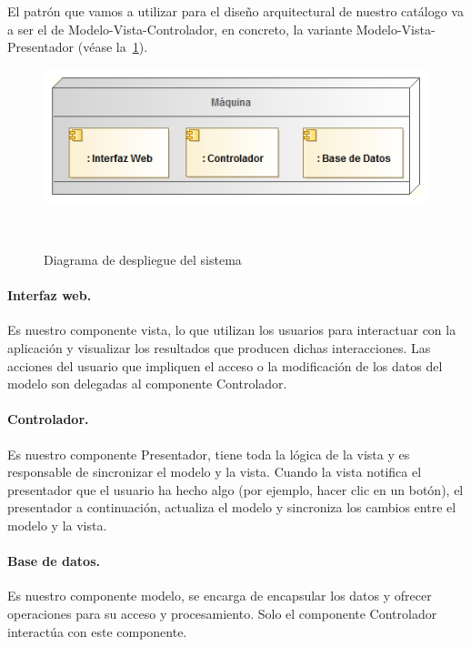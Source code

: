 El patrón que vamos a utilizar para el diseño arquitectural de nuestro 
catálogo va a ser el de Modelo-Vista-Controlador, en concreto, la variante Modelo-Vista-Presentador 
(véase la~\cref{fig:diagDespliegue}).

\vspace{.2cm}
\begin{figure}[ht]
\centerline{\includegraphics[scale=0.6]{img/diagrama_despliegue}}\
\caption{Diagrama de despliegue del sistema}
\label{fig:diagDespliegue}
\end{figure}


\paragraph{Interfaz web.} Es nuestro componente vista, lo que utilizan los usuarios para 
interactuar con la aplicación y visualizar los resultados que producen dichas
interacciones. Las acciones del usuario que impliquen el acceso o la modificación
de los datos del modelo son delegadas al componente Controlador.

\paragraph{Controlador.} Es nuestro componente Presentador, tiene toda la lógica de la vista 
y es responsable de sincronizar el modelo y la vista. Cuando la vista notifica el 
presentador que el usuario ha hecho algo (por ejemplo, hacer clic en un botón), 
el presentador a continuación, actualiza el modelo y sincroniza los cambios 
entre el modelo y la vista.

\paragraph{Base de datos.} Es nuestro componente modelo, se encarga de encapsular 
los datos y ofrecer operaciones para su acceso y procesamiento. Solo el componente
Controlador interactúa con este componente.